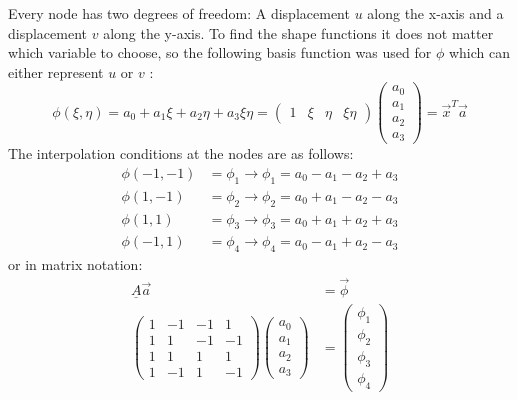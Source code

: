   Every node has two degrees of freedom: A displacement $u$ along the x-axis and a displacement $v$ along the y-axis. To find the shape functions it does not matter which variable to choose, so the following basis function was used for $\phi$ which can either represent $u$ or $v$ \cite{steinke2005finite}:
  \begin{equation}\label{eq:q4basis}
  \phi(\xi,\eta) = a_0 + a_1\xi + a_2\eta + a_3\xi\eta = \begin{pmatrix}
  1&\xi&\eta&\xi\eta
  \end{pmatrix}\begin{pmatrix}
  a_0\\a_1\\a_2\\a_3
  \end{pmatrix} = \vec{x}^T\vec{a}
  \end{equation}
  The interpolation conditions at the nodes are as follows:
  \begin{align}
  \phi(-1,-1) &= \phi_1 \rightarrow \phi_1 = a_0 -a_1 -a_2 +a_3 \nonumber\\
  \phi(1,-1) &= \phi_2 \rightarrow \phi_2 = a_0 +a_1 -a_2 -a_3 \nonumber\\
  \phi(1,1) &= \phi_3 \rightarrow \phi_3 = a_0 +a_1 +a_2 +a_3 \nonumber\\
  \phi(-1,1) &= \phi_4 \rightarrow \phi_4 = a_0 -a_1 +a_2 -a_3
  \end{align}
  or in matrix notation:
  \begin{align}
  \underline{A}\vec{a} &= \vec{\phi} \nonumber\\
  \begin{pmatrix}
  1 &-1&-1& 1\\
  1 & 1&-1&-1\\
  1 & 1& 1& 1\\
  1 &-1& 1&-1
  \end{pmatrix} \begin{pmatrix}
  a_0\\a_1\\a_2\\a_3
  \end{pmatrix} &= \begin{pmatrix}
  \phi_1\\\phi_2\\\phi_3\\\phi_4
  \end{pmatrix}
  \end{align}
